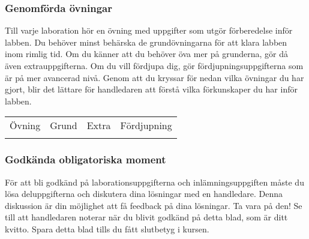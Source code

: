 


\subsubsection*{Genomförda övningar}

\vspace{1em}\noindent 
{Till varje laboration hör en övning med uppgifter som utgör förberedelse inför labben. Du behöver minst behärska de grundövningarna för att klara labben inom rimlig tid. Om du känner att du behöver öva mer på grunderna, gör då även extrauppgifterna. Om du vill fördjupa dig, gör fördjupningsuppgifterna som är på mer avancerad nivå. Genom att du kryssar för nedan vilka övningar du har gjort, blir det lättare för handledaren att förstå vilka förkunskaper du har inför labben.}

\newcommand{\TickBox}{\raisebox{-.50ex}{\Large$\square$}}
\newcommand{\ExeRow}[1]{\texttt{#1} & \TickBox  &  \TickBox &  \TickBox  \\ \addlinespace }

\begin{table}[h]
\centering
\vspace{2em}
\begin{tabular}{lccc}
\toprule \addlinespace 
{\sffamily\small Övning} & 
{\sffamily\small Grund} &	
{\sffamily\small Extra} &
{\sffamily\small Fördjupning}\\ \addlinespace \midrule \\[-0.7em]

\bottomrule
\end{tabular}
\end{table}

\newpage

\subsubsection*{Godkända obligatoriska moment}

\vspace{1em}\noindent 
För att bli godkänd på laborationsuppgifterna och inlämningsuppgiften måste du lösa deluppgifterna och diskutera dina lösningar med en handledare. Denna diskussion är din möjlighet att få feedback på dina lösningar. Ta vara på den!
Se till att handledaren noterar när du blivit godkänd på detta blad, som är ditt kvitto. Spara detta blad tills du fått slutbetyg i kursen. 



